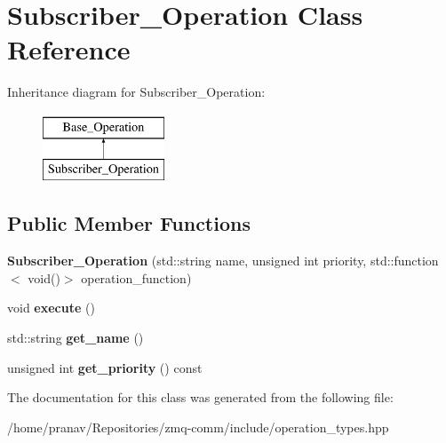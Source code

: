 \hypertarget{classSubscriber__Operation}{}\section{Subscriber\+\_\+\+Operation Class Reference}
\label{classSubscriber__Operation}
Inheritance diagram for Subscriber\+\_\+\+Operation\+:\begin{figure}[H]
\begin{center}
\leavevmode
\includegraphics[height=2.000000cm]{classSubscriber__Operation}
\end{center}
\end{figure}
\subsection*{Public Member Functions}
\begin{DoxyCompactItemize}
\item 
{\bfseries Subscriber\+\_\+\+Operation} (std\+::string name, unsigned int priority, std\+::function$<$ void()$>$ operation\+\_\+function)\hypertarget{classSubscriber__Operation_a12cd9532aec72e1a5c2264ef9bf854af}{}\label{classSubscriber__Operation_a12cd9532aec72e1a5c2264ef9bf854af}

\item 
void {\bfseries execute} ()\hypertarget{classSubscriber__Operation_a8163faae3d4f4a05c0279dcf63112909}{}\label{classSubscriber__Operation_a8163faae3d4f4a05c0279dcf63112909}

\item 
std\+::string {\bfseries get\+\_\+name} ()\hypertarget{classBase__Operation_a878dd0e855a78907e4c828b1d70587d0}{}\label{classBase__Operation_a878dd0e855a78907e4c828b1d70587d0}

\item 
unsigned int {\bfseries get\+\_\+priority} () const \hypertarget{classBase__Operation_a0d561f85d2454f7c5abbe9d0e264a98a}{}\label{classBase__Operation_a0d561f85d2454f7c5abbe9d0e264a98a}

\end{DoxyCompactItemize}


The documentation for this class was generated from the following file\+:\begin{DoxyCompactItemize}
\item 
/home/pranav/\+Repositories/zmq-\/comm/include/operation\+\_\+types.\+hpp\end{DoxyCompactItemize}
